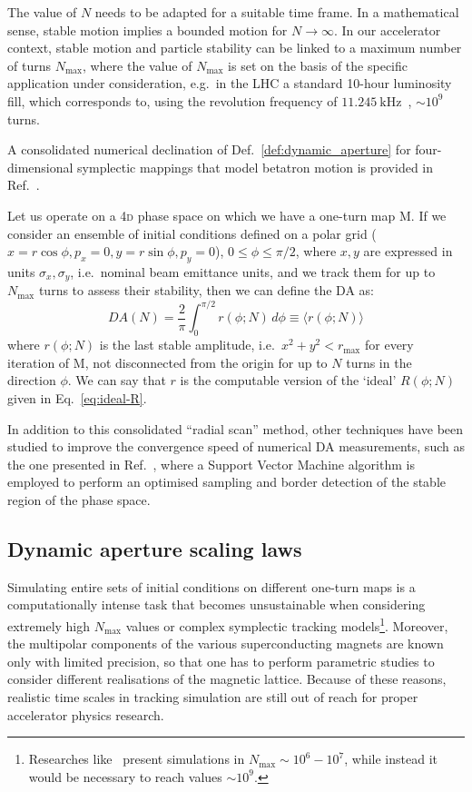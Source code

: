 The value of \(N\) needs to be adapted for a suitable time frame. In a mathematical sense, stable motion implies a bounded motion for \(N\rightarrow\infty\). In our accelerator context, stable motion and particle stability can be linked to a maximum number of turns \(N_{\text{max}}\), where the value of \(N_{\text{max}}\) is set on the basis of the specific application under consideration, e.g.\ in the LHC a standard 10-hour luminosity fill, which corresponds to, using the revolution frequency of \(\SI{11.245}{\kHz}\)~\cite{Benedikt:823808}, \(\sim 10^9\) turns.

A consolidated numerical declination of Def.~\ref{def:dynamic_aperture} for four-dimensional symplectic mappings that model betatron motion is provided in Ref.~\cite{PhysRevE.53.4067}.

Let us operate on a 4\textsc{d} phase space on which we have a one-turn map \(\mathrm{M}\). If we consider an ensemble of initial conditions defined on a polar grid (\(x=r\cos\phi, p_x=0, y=r\sin\phi, p_y=0\)), \(0\leq\phi\leq\pi/2\), where \(x,y\) are expressed in units \(\sigma_x, \sigma_y\), i.e.\ nominal beam emittance units, and we track them for up to \(N_{\text{max}}\) turns to assess their stability, then we can define the DA as:
\begin{equation}
	DA(N) = \frac{2}{\pi}\int_0^{\pi/2} r(\phi;N)\,d\phi \equiv \langle r(\phi;N)\rangle
	\label{eq:dynamic_aperture_numerical}
\end{equation}
where \(r(\phi;N)\) is the last stable amplitude, i.e.\ \(x^2 + y^2 < r_{\mathrm{max}}\) for every iteration of \(\mathrm{M}\), not disconnected from the origin for up to \(N\) turns in the direction \(\phi\). We can say that \(r\) is the computable version of the `ideal' \(R(\phi;N)\) given in Eq.~\eqref{eq:ideal-R}.

In addition to this consolidated ``radial scan'' method, other techniques have been studied to improve the convergence speed of numerical DA measurements, such as the one presented in Ref.~\cite{vanderveken:ipac2022-mopost047}, where a Support Vector Machine algorithm is employed to perform an optimised sampling and border detection of the stable region of the phase space.

\subsection{Dynamic aperture scaling laws}

Simulating entire sets of initial conditions on different one-turn maps is a computationally intense task that becomes unsustainable when considering extremely high \(N_{\text{max}}\) values or complex symplectic tracking models\footnote{Researches like~\cite{invlog} present simulations in $N_\text{max}\sim 10^6-10^7$, while instead it would be necessary to reach values \(\sim 10^9\).}. Moreover, the multipolar components of the various superconducting magnets are known only with limited precision, so that one has to perform parametric studies to consider different realisations of the magnetic lattice. Because of these reasons, realistic time scales in tracking simulation are still out of reach for proper accelerator physics research.

